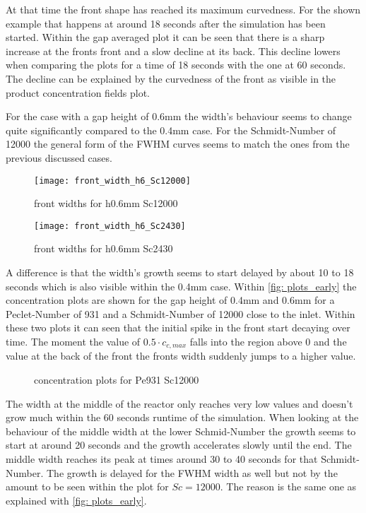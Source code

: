 \documentclass[../thesis.tex]{subfiles}
\begin{document}
At that time the front shape has reached its maximum curvedness. For the shown example that happens at around 18 seconds after the simulation has been started. Within the gap averaged plot it can be seen that there is a sharp increase at the fronts front and a slow decline at its back. This decline lowers when comparing the plots for a time of 18 seconds with the one at 60 seconds. The decline can be explained by the curvedness of the front as visible in the product concentration fields plot.
\newline

For the case with a gap height of 0.6mm the width's behaviour seems to change quite significantly compared to the 0.4mm case. For the Schmidt-Number of 12000 the general form of the FWHM curves seems to match the ones from the previous discussed cases.
\begin{figure}[htbp]
	\centering
	\texttt{[image: front\_width\_h6\_Sc12000]}
	\caption{front widths for h0.6mm Sc12000\label{fig: front_width_h6_Sc12000}}\bigskip
	\texttt{[image: front\_width\_h6\_Sc2430]}
	\caption{front widths for h0.6mm Sc2430\label{fig: front_width_pos_h6_Sc2430}}
\end{figure}
A difference is that the width's growth seems to start delayed by about 10 to 18 seconds which is also visible within the 0.4mm case. Within \autoref{fig: plots_early} the concentration plots are shown for the gap height of 0.4mm and 0.6mm for a Peclet-Number of 931 and a Schmidt-Number of 12000 close to the inlet. Within these two plots it can seen that the initial spike in the front start decaying over time. The moment the value of $0.5 \cdot c_{c,max}$ falls into the region above 0 and the value at the back of the front the fronts width suddenly jumps to a higher value.
\begin{figure}[htb]
	\centering
	\qquad
	\caption{concentration plots for Pe931 Sc12000}%
	\label{fig: plots_early}%
\end{figure}
The width at the middle of the reactor only reaches very low values and doesn't grow much within the 60 seconds runtime of the simulation. When looking at the behaviour of the middle width at the lower Schmid-Number the growth seems to start at around 20 seconds and the growth accelerates slowly until the end. The middle width reaches its peak at times around 30 to 40 seconds for that Schmidt-Number. The growth is delayed for the FWHM width as well but not by the amount to be seen within the plot for $Sc = 12000$. The reason is the same one as explained with \autoref{fig: plots_early}.
\end{document}
